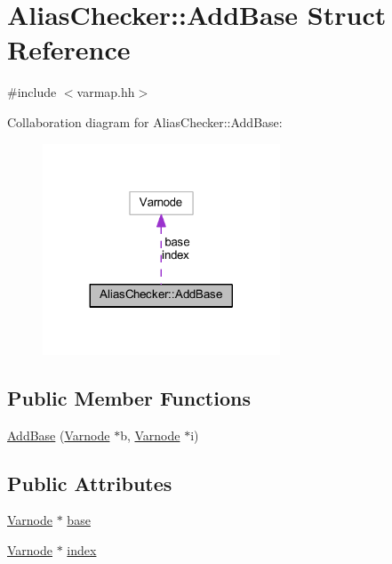 \hypertarget{struct_alias_checker_1_1_add_base}{}\section{Alias\+Checker\+::Add\+Base Struct Reference}
\label{struct_alias_checker_1_1_add_base}


{\ttfamily \#include $<$varmap.\+hh$>$}



Collaboration diagram for Alias\+Checker\+::Add\+Base\+:
\nopagebreak
\begin{figure}[H]
\begin{center}
\leavevmode
\includegraphics[width=200pt]{struct_alias_checker_1_1_add_base__coll__graph}
\end{center}
\end{figure}
\subsection*{Public Member Functions}
\begin{DoxyCompactItemize}
\item 
\mbox{\hyperlink{struct_alias_checker_1_1_add_base_a60e46bc207164a1171ffe8aef459135f}{Add\+Base}} (\mbox{\hyperlink{class_varnode}{Varnode}} $\ast$b, \mbox{\hyperlink{class_varnode}{Varnode}} $\ast$i)
\end{DoxyCompactItemize}
\subsection*{Public Attributes}
\begin{DoxyCompactItemize}
\item 
\mbox{\hyperlink{class_varnode}{Varnode}} $\ast$ \mbox{\hyperlink{struct_alias_checker_1_1_add_base_a76adc3cfe30ded04528ca4c879a4dbeb}{base}}
\item 
\mbox{\hyperlink{class_varnode}{Varnode}} $\ast$ \mbox{\hyperlink{struct_alias_checker_1_1_add_base_a57cd96c1c53a0fe5a8578d330d7ba146}{index}}
\end{DoxyCompactItemize}



